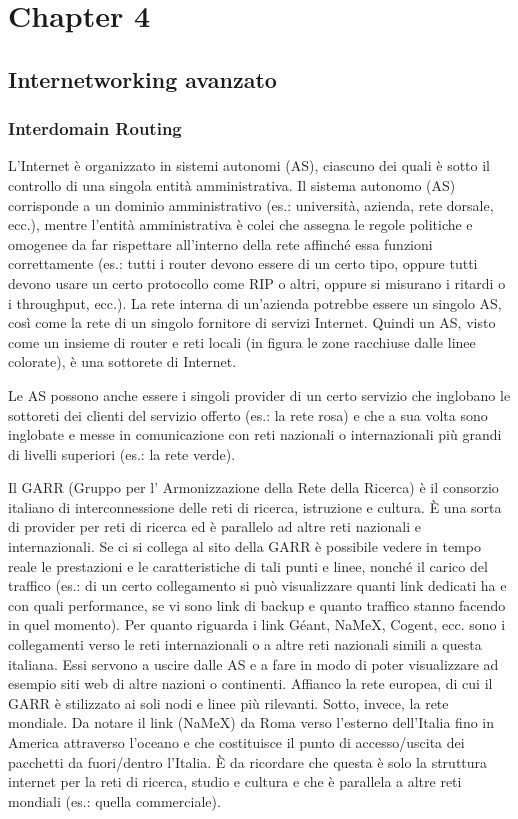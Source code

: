 \chapter{Chapter 4} \label{ch:Chapter4}
\section{Internetworking avanzato}
\subsection{Interdomain Routing}
L'Internet è organizzato in sistemi autonomi (AS), ciascuno dei quali è sotto il controllo di una singola entità amministrativa. Il sistema autonomo (AS) corrisponde a un dominio amministrativo (es.: università, azienda, rete dorsale, ecc.), mentre l’entità amministrativa è colei che assegna le regole politiche e omogenee da far rispettare all’interno della rete affinché essa funzioni correttamente (es.: tutti i router devono essere di un certo tipo, oppure tutti devono usare un certo protocollo come RIP o altri, oppure si misurano i ritardi o i throughput, ecc.). La rete interna di un’azienda potrebbe essere un singolo AS, così come la rete di un singolo fornitore di servizi Internet. Quindi un AS, visto come un insieme di router e reti locali (in figura le zone racchiuse dalle linee colorate), è una sottorete di Internet.
\begin{example}
Le AS possono anche essere i singoli provider di un certo servizio che inglobano le sottoreti dei clienti del servizio offerto (es.: la rete rosa) e che a sua volta sono inglobate e messe in comunicazione con reti nazionali o internazionali più grandi di livelli superiori (es.: la rete verde).
\end{example}
Il GARR (Gruppo per l’ Armonizzazione della Rete della Ricerca) è il consorzio italiano di interconnessione delle reti di ricerca, istruzione e cultura. È una sorta di provider per reti di ricerca ed è parallelo ad altre reti nazionali e internazionali.  Se ci si collega al sito della GARR è possibile vedere in tempo reale le prestazioni e le caratteristiche di tali punti e linee, nonché il carico del traffico (es.: di un certo collegamento si può visualizzare quanti link dedicati ha e con quali performance, se vi sono link di backup e quanto traffico stanno facendo in quel momento). Per quanto riguarda i link Géant, NaMeX, Cogent, ecc. sono i collegamenti verso le reti internazionali o a altre reti nazionali simili a questa italiana. Essi servono a uscire dalle AS e a fare in modo di poter visualizzare ad esempio siti web di altre nazioni o continenti. Affianco la rete europea, di cui il GARR è stilizzato ai soli nodi e linee più rilevanti. Sotto, invece, la rete mondiale. Da notare il link (NaMeX) da Roma verso l’esterno dell’Italia fino in America attraverso l’oceano e che costituisce il punto di accesso/uscita dei pacchetti da fuori/dentro l’Italia. È da ricordare che questa è solo la struttura internet per la reti di ricerca, studio e cultura e che è parallela a altre reti mondiali (es.: quella commerciale).
